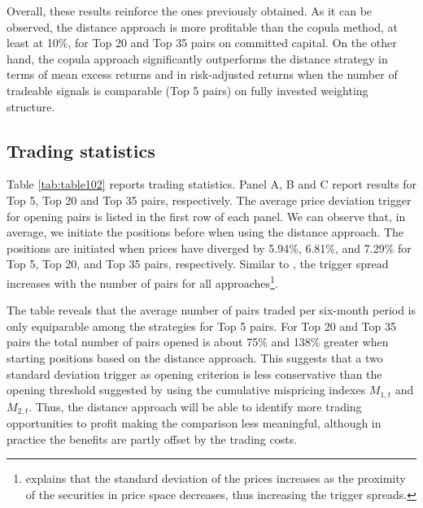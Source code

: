 \documentclass[a4paper]{article}
\begin{document}


Overall, these results reinforce the ones previously obtained. As it can be observed, the distance approach is more profitable than the copula method, at least at 10\%, for Top 20 and Top 35 pairs on committed capital. On the other hand, the copula approach significantly outperforms the distance strategy in terms of mean excess returns and in risk-adjusted returns when the number of tradeable signals is comparable (Top 5 pairs) on fully invested weighting structure.


\vspace{1.0cm}


	
	\subsection{Trading statistics}
	
	Table \ref{tab:table102} reports trading statistics. Panel A, B and C report results for Top 5, Top 20 and Top 35 pairs, respectively. The average price deviation trigger for opening pairs is listed in the first row of each panel. We can observe that, in average, we initiate the positions before when using the distance approach. The positions are initiated when prices have diverged by 5.94\%, 6.81\%, and 7.29\% for Top 5, Top 20, and Top 35 pairs, respectively. Similar to \citet*{ggr06}, the trigger spread increases with the number of pairs for all approaches\footnote{\citet*{ggr06} explains that the standard deviation of the prices increases as the proximity of the securities in price space decreases, thus increasing the trigger spreads.}.
	
	The table reveals that the average number of pairs traded per six-month period is only equiparable among the strategies for Top 5 pairs. For Top 20 and Top 35 pairs the total number of pairs opened is about 75\% and 138\% greater when starting positions based on the distance approach. This suggests that a two standard deviation trigger as opening criterion \citep{ggr06} is less conservative than the opening threshold suggested by \citet*{rf15} using the cumulative mispricing indexes $M_{1,t}$ and $M_{2,t}$. Thus, the distance approach will be able to identify more trading opportunities to profit making the comparison less meaningful, although in practice the benefits are partly offset by the trading costs.
	
\end{document}
